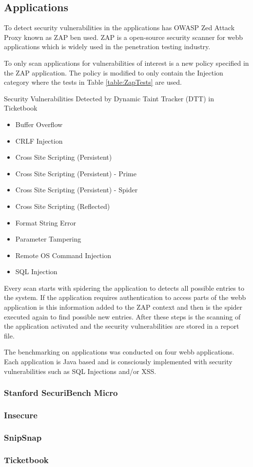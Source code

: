 \subsection{Applications}
To detect security vulnerabilities in the applications has OWASP Zed Attack Proxy \parencite{zap} known as ZAP ben used. ZAP is a open-source security scanner for webb applications which is widely used in the penetration testing industry.

To only scan applications for vulnerabilities of interest is a new policy specified in the ZAP application. The policy is modified to only contain the Injection category where the tests in Table \ref{table:ZapTests} are used.

\begin{table}[!hbt]
  \centering
  \caption{Security Vulnerabilities Detected by Dynamic Taint Tracker (DTT) in Ticketbook}
	\label{table:ZapTests}
	\begin{itemize}
		\item Buffer Overflow
		\item CRLF Injection
		\item Cross Site Scripting (Persistent)
		\item Cross Site Scripting (Persistent) - Prime
		\item Cross Site Scripting (Persistent) - Spider
		\item Cross Site Scripting (Reflected)
		\item Format String Error
		\item Parameter Tampering
		\item Remote OS Command Injection
		\item SQL Injection
	\end{itemize}
\end{table}

Every scan starts with spidering the application to detects all possible entries to the system. If the application requires authentication to access parts of the webb application is this information added to the ZAP context and then is the spider executed again to find possible new entries. After these steps is the scanning of the application activated and the security vulnerabilities are stored in a report file. 

The benchmarking on applications was conducted on four webb applications. Each application is Java based and is consciously implemented with security vulnerabilities such as SQL Injections and/or XSS. 



\subsubsection{Stanford SecuriBench Micro}
\subsubsection{Insecure}
\subsubsection{SnipSnap}
\subsubsection{Ticketbook}
